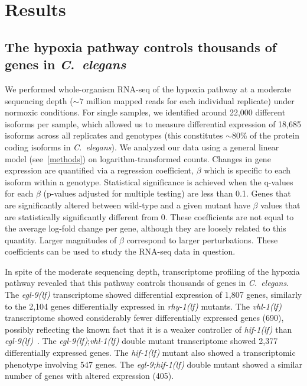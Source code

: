 \documentclass[9pt,twocolumn,twoside]{pnas-new}
\newcommand{\cel}{\emph{C.~elegans}}
\newcommand{\egl}{\emph{egl-9(lf)}}
\newcommand{\rhy}{\emph{rhy-1(lf)}}
\newcommand{\vhl}{\emph{vhl-1(lf)}}
\newcommand{\eglhif}{\emph{egl-9;hif-1(lf)}}
\newcommand{\hif}{\emph{hif-1(lf)}}
\newcommand{\egln}{1,807}
\newcommand{\rhyn}{2,104}
\newcommand{\vhln}{690}
\newcommand{\eglvhln}{2,377}
\newcommand{\hifn}{547}
\newcommand{\eglhifn}{405}
\begin{document}
\section*{Results}
\subsection*{The hypoxia pathway controls thousands of genes in \cel{}}
\label{sub:summary}

We performed whole-organism RNA-seq of the hypoxia pathway at a moderate
sequencing depth ($\sim7$ million mapped reads for each individual replicate)
under normoxic conditions. For single samples, we identified around 22,000 different
isoforms per sample, which allowed us to measure differential expression of 18,685
isoforms across all replicates and genotypes (this constitutes  $\sim$80\% of
the protein coding isoforms in \cel{}).
We analyzed our data using a general linear model (see~\ref{methods}) on
logarithm-transformed counts. Changes in gene expression are quantified via a
regression coefficient, $\beta$ which is specific to each isoform within a genotype.
Statistical significance is achieved when the q-values for each $\beta$ (p-values
adjusted for multiple testing) are less than 0.1. Genes that are significantly
altered between wild-type and a given mutant have $\beta$ values that are
statistically significantly different from 0.  These coefficients are not equal
to the average log-fold change per gene, although they are loosely related to
this quantity. Larger magnitudes of $\beta$ correspond to larger perturbations.
These coefficients can be used to study the RNA-seq data in question.

In spite of the moderate sequencing depth, transcriptome profiling of the hypoxia
pathway revealed that this pathway controls thousands of genes in \cel{}. The
\egl{} transcriptome showed differential expression of \egln{} genes, similarly to
the \rhyn{} genes differentially expressed in \rhy{} mutants. The \vhl{}
transcriptome showed considerably fewer differentially expressed genes (\vhln{}),
possibly reflecting the known fact that it is a weaker controller of \hif{} than
\egl{}~\cite{Shao2009}. The \egl{};\vhl{} double mutant transcriptome showed
\eglvhln{} differentially expressed genes. The \hif{} mutant also showed a
transcriptomic phenotype involving \hifn{} genes. The \eglhif{} double mutant
showed a similar number of genes with altered expression (\eglhifn{}).
\end{document}
